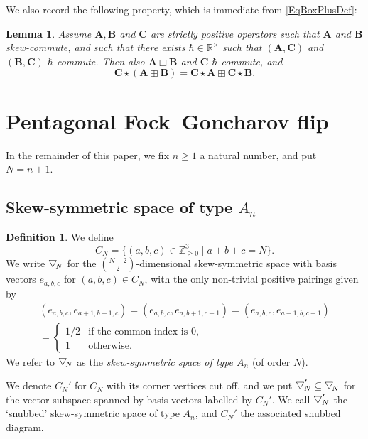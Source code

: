 \documentclass[11pt, reqno]{amsart}
\newtheorem{lemma}[theorem]{Lemma}
\theoremstyle{definition}
\newtheorem{defn}[theorem]{Definition}
\numberwithin{equation}{section}
\newcommand{\hr}[1]{\left(#1\right)}                                                    %
\def\R{\mathbb R}
\def\Z{\mathbb Z}
\newcommand{\Ab}{\mathbf{A}}
\newcommand{\Bb}{\mathbf{B}}
\newcommand{\Cb}{\mathbf{C}}
\newcommand{\btd}[1]{\raisebox{\depth}{$\bigtriangledown$\!}_{#1}}
\newcommand{\wbtd}[1]{\raisebox{\depth}{$\bigtriangledown'$\!\!}_{#1}}
\newcommand{\triangspace}{space of type $A_n$}
\begin{document}
We also record the following property, which is immediate from \eqref{EqBoxPlusDef}:

\begin{lemma}\label{LemSumSkewComm}
Assume $\Ab,\Bb$ and $\Cb$ are strictly positive operators such that $\Ab$ and $\Bb$ skew-commute, and such that there exists $\hbar\in \R^{\times}$ such that $(\Ab,\Cb)$ and $(\Bb,\Cb)$ $\hbar$-commute. Then also $\Ab\boxplus \Bb$ and $\Cb$ $\hbar$-commute, and 
\begin{equation}
\Cb\star(\Ab\boxplus \Bb) = \Cb\star\Ab\boxplus \Cb\star\Bb.
\end{equation}
\end{lemma}


\section{Pentagonal Fock--Goncharov flip}\label{SecConstrMultUni}



In the remainder of this paper, we fix $n \geq 1$ a natural number, and put $N = n+1$. 

\subsection{Skew-symmetric \texorpdfstring{\triangspace}{of type An}}

\begin{defn}\label{DefFGDiag}
We define 
\begin{equation}\label{EqConeC}
C_N = \{(a,b,c) \in \Z_{\geq0}^3\mid a+b+c=N\}.
\end{equation}
We write $\btd{N}$ for the $\binom{N+2}{2}$-dimensional skew-symmetric space with basis vectors $e_{a,b,c}$ for $(a,b,c) \in C_N$, with the only non-trivial positive pairings given by
\begin{multline}
\label{eq:q-comm}
\hr{e_{a,b,c},e_{a+1,b-1,c}} = \hr{e_{a,b,c},e_{a,b+1,c-1}} = \hr{e_{a,b,c},e_{a-1,b,c+1}} \\ =
\begin{cases}
1/2 & \text{if the common index is }0, \\
1 &\text{otherwise.}
\end{cases}
\end{multline}
We refer to $\btd{N}$ as the \emph{skew-symmetric \triangspace} (of order $N$). 

We denote $C_N'$ for $C_N$ with its corner vertices cut off, and we put $\wbtd{N} \subseteq \btd{N}$ for the vector subspace spanned by basis vectors labelled by $C_N'$. We call $\wbtd{N}$ the `snubbed' skew-symmetric \triangspace, and $C_N'$ the associated snubbed diagram. 
\end{defn}
\end{document}
